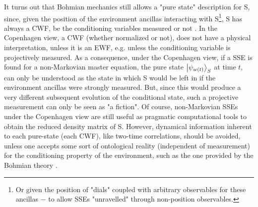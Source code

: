 \documentclass[11pt, a4paper]{article} %
\begin{document}
It turns out that Bohmian mechanics still allows a "pure state" description for S, since, given the position of the environment ancillas interacting with S\footnote{Or given the position of "dials" coupled with arbitrary observables for these ancillas $-$ to allow SSEs "unravelled" through non-position observables.}, S has always a CWF, be the conditioning variables measured or not \cite{NMisModal, interpretSSE}. In the Copenhagen view, a CWF (whether normalized or not), does not have a physical interpretation, unless it is an EWF, e.g. unless the conditioning variable is projectively measured. As a consequence, under the Copenhagen view, if a SSE is found for a non-Markovian master equation, the pure state $\ket{\psi_{w(t)}}_S$ at time $t$, can only be understood as the state in which S would be left in if the environment ancillas were strongly measured. But, since this would produce a very different subsequent evolution of the conditional state, such a projective measurement can only be seen as "a fiction". Of course, non-Markovian SSEs under the Copenhagen view are still useful as pragmatic computational tools to obtain the reduced density matrix of S. However, dynamical information inherent to each pure-state (each CWF), like two-time correlations, should be avoided, unless one accepts some sort of ontological reality (independent of measurement) for the conditioning property of the environment, such as the one provided by the Bohmian theory \cite{NMisModal, interpretSSE}.
\end{document}
